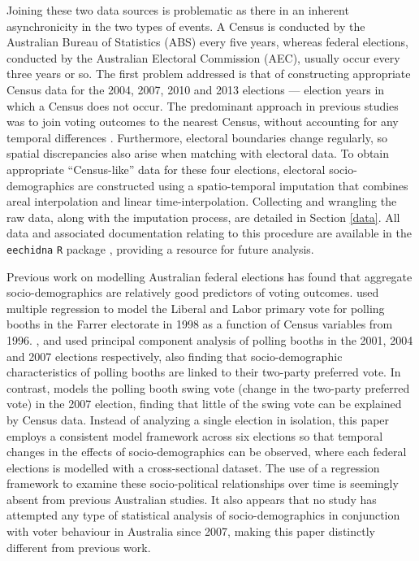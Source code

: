 \documentclass[11pt,a4paper,]{article}
\begin{document}
Joining these two data sources is problematic as there in an inherent
asynchronicity in the two types of events. A Census is conducted by the
Australian Bureau of Statistics (ABS) every five years, whereas federal
elections, conducted by the Australian Electoral Commission (AEC),
usually occur every three years or so. The first problem addressed is
that of constructing appropriate Census data for the 2004, 2007, 2010
and 2013 elections --- election years in which a Census does not occur.
The predominant approach in previous studies was to join voting outcomes
to the nearest Census, without accounting for any temporal differences
\autocites[see][]{DavisStimson98}{Stimson06}{Liao09}{Stimson09}.
Furthermore, electoral boundaries change regularly, so spatial
discrepancies also arise when matching with electoral data. To obtain
appropriate ``Census-like'' data for these four elections, electoral
socio-demographics are constructed using a spatio-temporal imputation
that combines areal interpolation \autocite{Goodchild1993} and linear
time-interpolation. Collecting and wrangling the raw data, along with
the imputation process, are detailed in Section \ref{data}. All data and
associated documentation relating to this procedure are available in the
\texttt{eechidna} \texttt{R} package \autocite{eechidna}, providing a
resource for future analysis.

Previous work on modelling Australian federal elections has found that
aggregate socio-demographics are relatively good predictors of voting
outcomes. \textcite{Forrest01} used multiple regression to model the
Liberal and Labor primary vote for polling booths in the Farrer
electorate in 1998 as a function of Census variables from 1996.
\textcite{Stimson06}, \textcite{Stimson09} and \textcite{Stimson12} used
principal component analysis of polling booths in the 2001, 2004 and
2007 elections respectively, also finding that socio-demographic
characteristics of polling booths are linked to their two-party
preferred vote. In contrast, \textcite{Stimson09} models the polling
booth swing vote (change in the two-party preferred vote) in the 2007
election, finding that little of the swing vote can be explained by
Census data. Instead of analyzing a single election in isolation, this
paper employs a consistent model framework across six elections so that
temporal changes in the effects of socio-demographics can be observed,
where each federal elections is modelled with a cross-sectional dataset.
The use of a regression framework to examine these socio-political
relationships over time is seemingly absent from previous Australian
studies. It also appears that no study has attempted any type of
statistical analysis of socio-demographics in conjunction with voter
behaviour in Australia since 2007, making this paper distinctly
different from previous work.
\end{document}
